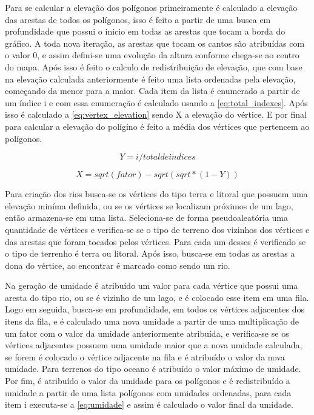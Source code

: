 Para se calcular a elevação dos polígonos primeiramente é calculado a elevação das arestas de todos os polígonos, isso é feito a partir de uma busca em profundidade que possui o inicio em todas as arestas que tocam a borda do gráfico. A toda nova iteração, as arestas que tocam os cantos são atribuídas com o valor 0, e assim defini-se uma evolução da altura conforme chega-se ao centro do mapa.
Após isso é feito o calculo de redistribuição de elevação, que com base na elevação calculada anteriormente é feito uma lista ordenadas pela elevação, começando da menor para a maior. Cada item da lista é enumerado a partir de um índice i e com essa enumeração é calculado usando a \cref{eq:total_indexes}. Após isso é calculado a \cref{eq:vertex_elevation} sendo X a elevação do vértice.
E por final para calcular a elevação do polígino é feito a média dos vértices que pertencem ao polígonos.

\begin{equation}
	\label{eq:total_indexes}
	Y = i / total de indices
\end{equation}

\begin{equation}
	\label{eq:vertex_elevation}
	X = sqrt(fator) - sqrt(sqrt * (1 - Y))
\end{equation}

Para criação dos rios busca-se os vértices do tipo terra e litoral que possuem uma elevação miníma definida, ou se os vértices se localizam próximos de um lago, então armazena-se em uma lista. Seleciona-se de forma pseudoaleatória uma quantidade de vértices e verifica-se se o tipo de terreno dos vizinhos dos vértices e das arestas que foram tocados pelos vértices. Para cada um desses é verificado se o tipo de terrenho é terra ou litoral. Após isso, busca-se em todas as arestas a dona do vértice, ao encontrar é marcado como sendo um rio.

Na geração de umidade é atribuído um valor para cada vértice que possui uma aresta do tipo rio, ou se é vizinho de um lago, e é colocado esse item em uma fila. Logo em seguida, busca-se em profundidade, em todos os vértices adjacentes dos itens da fila, e é calculado uma nova umidade a partir de uma multiplicação de um fator com o valor da umidade anteriormente atribuída, e verifica-se se os vértices adjacentes possuem uma umidade maior que a nova umidade calculada, se forem é colocado o vértice adjacente na fila e é atribuído o valor da nova umidade. Para terrenos do tipo oceano é atribuído o valor máximo de umidade.
Por fim, é atribuído o valor da umidade para os polígonos e é redistribuído a umidade a partir de uma lista polígonos com umidades ordenadas, para cada item i executa-se a \cref{eq:umidade} e assim é calculado o valor final da umidade.

